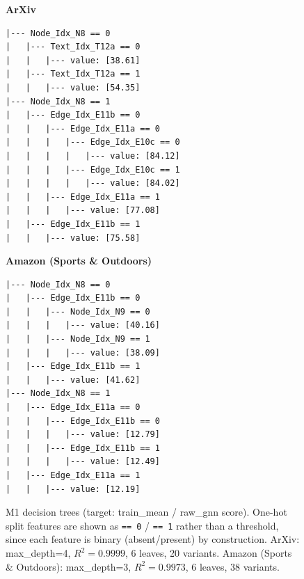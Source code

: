 \begin{figure}[htbp]
\centering
\begin{minipage}[t]{0.48\textwidth}
\centering
\textbf{ArXiv}\\[2pt]
\footnotesize
\begin{verbatim}
|--- Node_Idx_N8 == 0
|   |--- Text_Idx_T12a == 0
|   |   |--- value: [38.61]
|   |--- Text_Idx_T12a == 1
|   |   |--- value: [54.35]
|--- Node_Idx_N8 == 1
|   |--- Edge_Idx_E11b == 0
|   |   |--- Edge_Idx_E11a == 0
|   |   |   |--- Edge_Idx_E10c == 0
|   |   |   |   |--- value: [84.12]
|   |   |   |--- Edge_Idx_E10c == 1
|   |   |   |   |--- value: [84.02]
|   |   |--- Edge_Idx_E11a == 1
|   |   |   |--- value: [77.08]
|   |--- Edge_Idx_E11b == 1
|   |   |--- value: [75.58]
\end{verbatim}
\end{minipage}
\hfill
\begin{minipage}[t]{0.48\textwidth}
\centering
\textbf{Amazon (Sports \& Outdoors)}\\[2pt]
\footnotesize
\begin{verbatim}
|--- Node_Idx_N8 == 0
|   |--- Edge_Idx_E11b == 0
|   |   |--- Node_Idx_N9 == 0
|   |   |   |--- value: [40.16]
|   |   |--- Node_Idx_N9 == 1
|   |   |   |--- value: [38.09]
|   |--- Edge_Idx_E11b == 1
|   |   |--- value: [41.62]
|--- Node_Idx_N8 == 1
|   |--- Edge_Idx_E11a == 0
|   |   |--- Edge_Idx_E11b == 0
|   |   |   |--- value: [12.79]
|   |   |--- Edge_Idx_E11b == 1
|   |   |   |--- value: [12.49]
|   |--- Edge_Idx_E11a == 1
|   |   |--- value: [12.19]
\end{verbatim}
\end{minipage}
\caption{M1 decision trees (target: train\_mean / raw\_gnn score). One-hot split features are shown as \texttt{== 0} / \texttt{== 1} rather than a threshold, since each feature is binary (absent/present) by construction. ArXiv: max\_depth=4, $R^2=0.9999$, 6 leaves, 20 variants. Amazon (Sports \& Outdoors): max\_depth=3, $R^2=0.9973$, 6 leaves, 38 variants.}
\label{fig:m1-trees-arxiv-amazon}
\end{figure}
